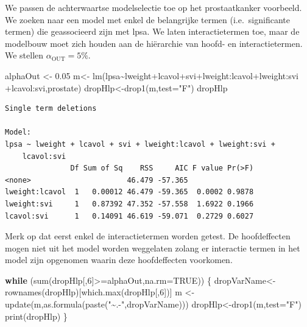 \documentclass[
  dutch,
  letterpaper,
  12pt]{book}
\newenvironment{Shaded}{\begin{snugshade}}{\end{snugshade}}
\newcommand{\AttributeTok}[1]{\textcolor[rgb]{0.40,0.45,0.13}{#1}}
\newcommand{\ConstantTok}[1]{\textcolor[rgb]{0.56,0.35,0.01}{#1}}
\newcommand{\ControlFlowTok}[1]{\textcolor[rgb]{0.00,0.23,0.31}{\textbf{#1}}}
\newcommand{\DecValTok}[1]{\textcolor[rgb]{0.68,0.00,0.00}{#1}}
\newcommand{\FloatTok}[1]{\textcolor[rgb]{0.68,0.00,0.00}{#1}}
\newcommand{\FunctionTok}[1]{\textcolor[rgb]{0.28,0.35,0.67}{#1}}
\newcommand{\NormalTok}[1]{\textcolor[rgb]{0.00,0.23,0.31}{#1}}
\newcommand{\OtherTok}[1]{\textcolor[rgb]{0.00,0.23,0.31}{#1}}
\newcommand{\SpecialCharTok}[1]{\textcolor[rgb]{0.37,0.37,0.37}{#1}}
\newcommand{\StringTok}[1]{\textcolor[rgb]{0.13,0.47,0.30}{#1}}
\newcounter{none} %
\theoremstyle{definition}
\theoremstyle{definition}
\theoremstyle{definition}
\theoremstyle{remark}
\begin{document}
We passen de achterwaartse modelselectie toe op het prostaatkanker
voorbeeld. We zoeken naar een model met enkel de belangrijke termen
(i.e.~significante termen) die geassocieerd zijn met lpsa. We laten
interactietermen toe, maar de modelbouw moet zich houden aan de
hiërarchie van hoofd- en interactietermen. We stellen
\(\alpha_{\text{OUT}}=5\%\).

\begin{Shaded}
\begin{Highlighting}[]
\NormalTok{alphaOut }\OtherTok{\textless{}{-}} \FloatTok{0.05}
\NormalTok{m}\OtherTok{\textless{}{-}} \FunctionTok{lm}\NormalTok{(lpsa}\SpecialCharTok{\textasciitilde{}}\NormalTok{lweight}\SpecialCharTok{+}\NormalTok{lcavol}\SpecialCharTok{+}\NormalTok{svi}\SpecialCharTok{+}\NormalTok{lweight}\SpecialCharTok{:}\NormalTok{lcavol}\SpecialCharTok{+}\NormalTok{lweight}\SpecialCharTok{:}\NormalTok{svi }\SpecialCharTok{+}\NormalTok{lcavol}\SpecialCharTok{:}\NormalTok{svi,prostate)}
\NormalTok{dropHlp}\OtherTok{\textless{}{-}}\FunctionTok{drop1}\NormalTok{(m,}\AttributeTok{test=}\StringTok{"F"}\NormalTok{)}
\NormalTok{dropHlp}
\end{Highlighting}
\end{Shaded}

\begin{verbatim}
Single term deletions

Model:
lpsa ~ lweight + lcavol + svi + lweight:lcavol + lweight:svi + 
    lcavol:svi
               Df Sum of Sq    RSS     AIC F value Pr(>F)
<none>                      46.479 -57.365               
lweight:lcavol  1   0.00012 46.479 -59.365  0.0002 0.9878
lweight:svi     1   0.87392 47.352 -57.558  1.6922 0.1966
lcavol:svi      1   0.14091 46.619 -59.071  0.2729 0.6027
\end{verbatim}

Merk op dat eerst enkel de interactietermen worden getest. De
hoofdeffecten mogen niet uit het model worden weggelaten zolang er
interactie termen in het model zijn opgenomen waarin deze hoofdeffecten
voorkomen.

\begin{Shaded}
\begin{Highlighting}[]
\ControlFlowTok{while}\NormalTok{ (}\FunctionTok{sum}\NormalTok{(dropHlp[,}\DecValTok{6}\NormalTok{]}\SpecialCharTok{\textgreater{}=}\NormalTok{alphaOut,}\AttributeTok{na.rm=}\ConstantTok{TRUE}\NormalTok{))}
\NormalTok{\{}
\NormalTok{dropVarName}\OtherTok{\textless{}{-}}\FunctionTok{rownames}\NormalTok{(dropHlp)[}\FunctionTok{which.max}\NormalTok{(dropHlp[,}\DecValTok{6}\NormalTok{])]}
\NormalTok{m }\OtherTok{\textless{}{-}} \FunctionTok{update}\NormalTok{(m,}\FunctionTok{as.formula}\NormalTok{(}\FunctionTok{paste}\NormalTok{(}\StringTok{"\textasciitilde{}.{-}"}\NormalTok{,dropVarName)))}
\NormalTok{dropHlp}\OtherTok{\textless{}{-}}\FunctionTok{drop1}\NormalTok{(m,}\AttributeTok{test=}\StringTok{"F"}\NormalTok{)}
\FunctionTok{print}\NormalTok{(dropHlp)}
\NormalTok{\}}
\end{Highlighting}
\end{Shaded}
\end{document}
